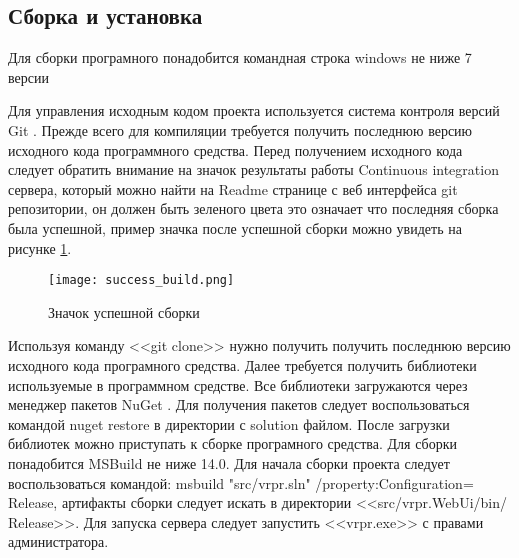 \subsection{Сборка и установка}
\label{sub:creation:build_and_install}

Для сборки програмного понадобится командная строка windows не ниже 7 версии

Для управления исходным кодом проекта используется система контроля версий Git \cite{git}. Прежде всего для компиляции требуется получить последнюю версию исходного кода программного средства. Перед получением исходного кода следует обратить внимание на значок результаты работы Continuous integration сервера, который можно найти на Readme странице с веб интерфейса git репозитории, он должен быть зеленого цвета это означает что последняя сборка была успешной, пример значка после успешной сборки можно увидеть на рисунке \ref{fig:domain:recognition:installation:success_build}.
\begin{figure}[ht] 
    \centering
    \texttt{[image: success\_build.png]}  
    \caption{Значок успешной сборки}
    \label{fig:domain:recognition:installation:success_build}
\end{figure}

Используя команду <<git clone>> нужно получить получить последнюю версию исходного кода програмного средства. Далее требуется получить библиотеки используемые в программном средстве. Все библиотеки загружаются через менеджер пакетов NuGet \cite{nuget}. Для получения пакетов следует воспользоваться командой nuget restore в директории с solution файлом. После загрузки библиотек можно приступать к сборке програмного средства. Для сборки понадобится MSBuild не ниже 14.0. Для начала сборки проекта следует воспользоваться командой: msbuild "src/vrpr.sln"  /property:Configuration= Release, артифакты сборки следует искать в директории <<src/vrpr.WebUi/bin/ Release>>. Для запуска сервера следует запустить <<vrpr.exe>> с правами администратора.